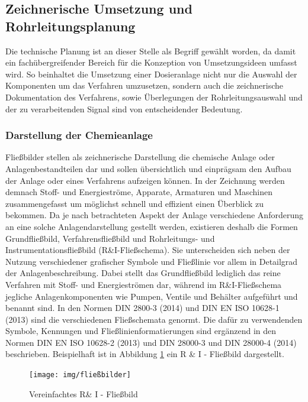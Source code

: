 \subsection{Zeichnerische Umsetzung und Rohrleitungsplanung}
Die technische Planung ist an dieser Stelle als Begriff gewählt worden, da damit ein fachübergreifender Bereich für die Konzeption von Umsetzungsideen umfasst wird. So beinhaltet die Umsetzung einer Dosieranlage nicht nur die Auswahl der Komponenten um das Verfahren umzusetzen, sondern auch die zeichnerische Dokumentation des Verfahrens, sowie Überlegungen der Rohrleitungsauswahl und der zu verarbeitenden Signal sind von entscheidender Bedeutung. 

\subsubsection{Darstellung der Chemieanlage}
Fließbilder stellen als zeichnerische Darstellung die chemische Anlage oder Anlagenbestandteilen dar und sollen übersichtlich und einprägsam den Aufbau der Anlage oder eines Verfahrens aufzeigen können. In der Zeichnung werden demnach Stoff- und Energieströme, Apparate, Armaturen und Maschinen zusammengefasst um möglichst schnell und effizient einen Überblick zu bekommen. Da je nach betrachteten Aspekt der Anlage verschiedene Anforderung an eine solche Anlagendarstellung gestellt werden, existieren deshalb die Formen Grundfließbild, Verfahrensfließbild und Rohrleitungs- und Instrumentationsfließbild (R\&I-Fließschema). Sie unterscheiden sich neben der Nutzung verschiedener grafischer Symbole und Fließlinie vor allem in Detailgrad der Anlagenbeschreibung. Dabei stellt das Grundfließbild lediglich das reine Verfahren mit Stoff- und Energieströmen dar, während im R\&I-Fließschema jegliche Anlagenkomponenten wie Pumpen, Ventile und Behälter aufgeführt und benannt sind. In den Normen DIN 2800-3 (2014) und DIN EN ISO 10628-1 (2013) sind die verschiedenen Fließschemata genormt. Die dafür zu verwendenden Symbole, Kennungen und Fließlinienformatierungen sind ergänzend in den Normen DIN EN ISO 10628-2 (2013) und DIN 28000-3 und DIN 28000-4 (2014) beschrieben. Beispielhaft ist in Abbildung \ref{fig:fließbilder} ein R \& I - Fließbild dargestellt. \cite{Ignatowitz.2015}

\begin{figure}[h!]
	\centering
	\texttt{[image: img/fließbilder]}
	\caption{Vereinfachtes R\& I - Fließbild}
	\label{fig:fließbilder}
\end{figure}
\FloatBarrier

